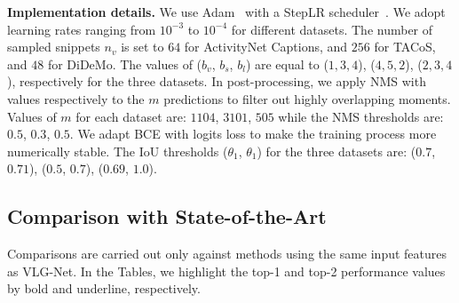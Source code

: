 \documentclass[10pt,twocolumn,letterpaper]{article}
\begin{document}
\begin{table}[!t]
    \centering {}
\vspace{.1cm}
\caption{\label{tab:datasets}{\bf Datasets statistics.} We report relevant information for each datasets available for the grounding task. }
     \vspace{-0.5cm}
\end{table}

\noindent\textbf{Implementation details.}
We use Adam~\cite{kingma2014adam} with a StepLR scheduler~\cite{loshchilov2016sgdr}. 
We adopt learning rates ranging from $10^{-3}$ to $10^{-4}$ for different datasets. The number of sampled snippets $n_v$ is set to $64$ for ActivityNet Captions, and $256$ for TACoS, and $48$ for DiDeMo. The values of ($b_v$, $b_s$, $b_l$) are equal to ($1,3,4$), ($4,5,2$), ($2,3,4$), respectively for the three datasets. In post-processing, we apply NMS with values respectively to the $m$ predictions to filter out highly overlapping moments. Values of $m$ for each dataset are: $1104$, $3101$, $505$ while the NMS thresholds are: $0.5$, $0.3$, $0.5$. We adapt BCE with logits loss to make the training process more numerically stable. The IoU thresholds ($\theta_1$, $\theta_1$) for the three datasets are: ($0.7$, $0.71$), ($0.5$, $0.7$), ($0.69$, $1.0$).



\subsection{Comparison with State-of-the-Art}
Comparisons are carried out only against methods using the same input features as VLG-Net. In the Tables, we highlight the top-1 and top-2 performance values by bold and underline, respectively. 
\end{document}
